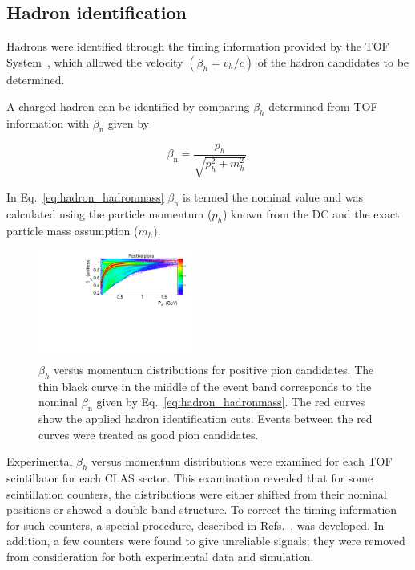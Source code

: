 \documentclass[prc,twocolumn,superscriptaddress,showpacs,amssymb,amsmath,amsfonts,aps,nofootinbib]{revtex4-1}
\begin{document}
\subsection{Hadron identification}

Hadrons were identified through the timing information provided by the TOF System~\cite{Smith:1999ii, clas_tof_paddles}, which allowed the velocity $(\beta_{h} = v_{h}/c)$ of the hadron candidates to be determined.

A charged hadron can be identified by comparing $\beta_{h}$ determined from TOF information with $\beta_{\text{n}}$ given by 

\begin{equation}
\beta_{\text{n}}=\frac{p_{h}}{\sqrt{p_{h}^{2}+m_{h}^{2}}}.
\label{eq:hadron_hadronmass}
\end{equation}

In Eq.\!~\eqref{eq:hadron_hadronmass} $\beta_{\text{n}}$ is termed the nominal value and was calculated using the particle momentum ($p_{h}$) known from the DC and the exact particle mass assumption ($m_{h}$).

\begin{figure}[htp]
\begin{center}
 \includegraphics[width=0.45\textwidth,keepaspectratio]{pictures/event_selection/hadron_id_cuts.pdf}
\vspace{-0.1cm}
\caption{$\beta_{h}$ versus momentum distributions for positive pion candidates. The thin black curve in the middle of the event band corresponds to the nominal $\beta_{\text{n}}$ given by Eq.\!~\eqref{eq:hadron_hadronmass}. The red curves show the applied hadron identification cuts. Events between the red curves were treated as good pion candidates. }
\label{fig:hadron_id}
\end{center}
\end{figure}

Experimental $\beta_{h}$ versus momentum distributions were examined for each TOF scintillator for each CLAS sector. This examination revealed that for some scintillation counters, the distributions were either shifted from their nominal positions or showed a double-band structure. To correct the timing information for such counters, a special procedure, described in Refs.\!~\cite{my_an_note:2020, my_thesis:2021}, was developed. In addition, a few counters were found to give unreliable signals; they were removed from consideration for both experimental data and simulation.
\end{document}
